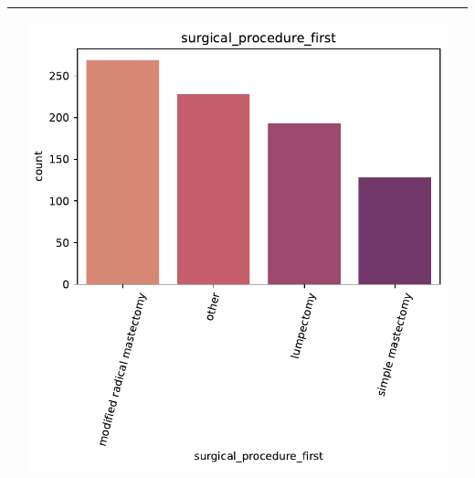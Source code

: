 \begin{table}[!htb]
\begin{threeparttable}
\begin{tabular}{p{2.5cm} p{7cm} p{6.5cm}}
			& \begin{center}\includegraphics[width=1\linewidth]{NOTEBOOK/IMAGENES_DESCRIPTIVAS/41_surgical_procedure_first}\end{center}
			\\ \hline

		\end{tabular}
\end{threeparttable}
\end{table}

